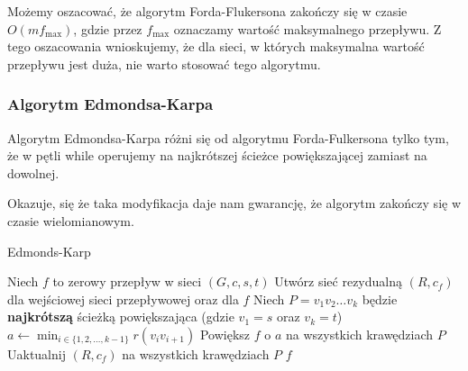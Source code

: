 Możemy oszacować, że algorytm Forda-Flukersona 
zakończy się w czasie $O(mf_{\max})$, gdzie 
przez $f_{\max}$ oznaczamy wartość maksymalnego przepływu. 
Z tego oszacowania wnioskujemy, że dla sieci, w których
maksymalna wartość przepływu jest duża, 
nie warto stosować tego algorytmu. 

\subsubsection{Algorytm Edmondsa-Karpa}
Algorytm Edmondsa-Karpa różni się od 
algorytmu Forda-Fulkersona tylko tym, że
w pętli while operujemy na najkrótszej ścieżce powiększającej
zamiast na dowolnej.

Okazuje, się że taka modyfikacja daje nam gwarancję, że
algorytm zakończy się w czasie wielomianowym.

\begin{algorithm}[H]
	\caption{Edmonds-Karp}\label{edmonds-karp_alg}
	\begin{algorithmic}[1]
		\State Niech $f$ to zerowy przepływ w sieci $(G,c,s,t)$
		\State Utwórz sieć rezydualną $(R, c_f)$ dla wejściowej 
		sieci przepływowej oraz dla $f$ 
		\State Niech $P = v_1v_2\dots v_k$ będzie \textbf{najkrótszą}
		ścieżką powiększająca (gdzie $v_1 = s$ oraz $v_k = t$)
		\State $a \gets \min_{i \in \{1, 2, \dots, k-1\}} r(v_iv_{i+1})$
		\State Powiększ $f$ o $a$ na wszystkich krawędziach $P$
		\State Uaktualnij $(R, c_f)$ na wszystkich krawędziach $P$
		\EndWhile
		\State \Return $f$
		\EndProcedure
	\end{algorithmic}
\end{algorithm}


